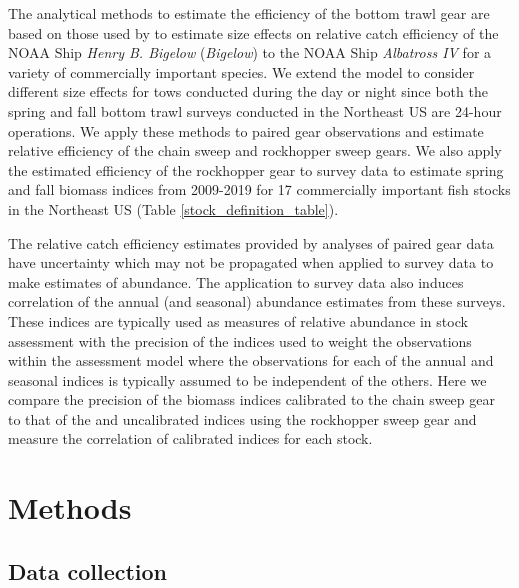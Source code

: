 \documentclass[
  12pt,
]{article}
\begin{document}
The analytical methods to estimate the efficiency of the bottom trawl
gear are based on those used by \citet{miller13} to estimate size
effects on relative catch efficiency of the NOAA Ship \emph{Henry B.
Bigelow} (\emph{Bigelow}) to the NOAA Ship \emph{Albatross IV} for a
variety of commercially important species. We extend the model to
consider different size effects for tows conducted during the day or
night since both the spring and fall bottom trawl surveys conducted in
the Northeast US are 24-hour operations. We apply these methods to
paired gear observations and estimate relative efficiency of the chain
sweep and rockhopper sweep gears. We also apply the estimated efficiency
of the rockhopper gear to survey data to estimate spring and fall
biomass indices from 2009-2019 for 17 commercially important fish stocks
in the Northeast US (Table \ref{stock_definition_table}).

The relative catch efficiency estimates provided by analyses of paired
gear data have uncertainty which may not be propagated when applied to
survey data to make estimates of abundance. The application to survey
data also induces correlation of the annual (and seasonal) abundance
estimates from these surveys. These indices are typically used as
measures of relative abundance in stock assessment with the precision of
the indices used to weight the observations within the assessment model
where the observations for each of the annual and seasonal indices is
typically assumed to be independent of the others. Here we compare the
precision of the biomass indices calibrated to the chain sweep gear to
that of the and uncalibrated indices using the rockhopper sweep gear and
measure the correlation of calibrated indices for each stock.

\hypertarget{methods}{%
\section{Methods}\label{methods}}

\hypertarget{data-collection}{%
\subsection{Data collection}\label{data-collection}}
\end{document}
